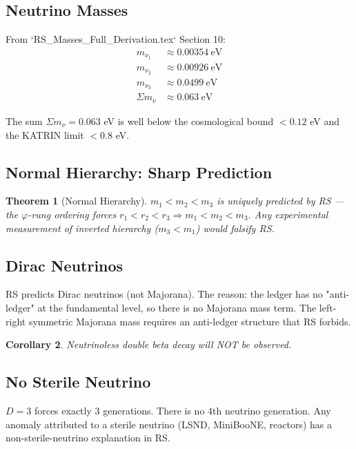 \documentclass[12pt,a4paper]{article}
\newtheorem{theorem}{Theorem}[section]
\newtheorem{corollary}[theorem]{Corollary}
\theoremstyle{definition}
\theoremstyle{remark}
\begin{document}
\subsection{Neutrino Masses}

From `RS_Masses_Full_Derivation.tex` Section 10:
\begin{align}
m_{\nu_1} &\approx 0.00354~\mathrm{eV}\\
m_{\nu_2} &\approx 0.00926~\mathrm{eV}\\
m_{\nu_3} &\approx 0.0499~\mathrm{eV}\\
\Sigma m_\nu &\approx 0.063~\mathrm{eV}
\end{align}

The sum $\Sigma m_\nu = 0.063$ eV is well below the cosmological bound $< 0.12$ eV 
and the KATRIN limit $< 0.8$ eV.

\subsection{Normal Hierarchy: Sharp Prediction}

\begin{theorem}[Normal Hierarchy]
$m_1 < m_2 < m_3$ is uniquely predicted by RS --- the $\varphi$-rung 
ordering forces $r_1 < r_2 < r_3 \Rightarrow m_1 < m_2 < m_3$.
Any experimental measurement of inverted hierarchy ($m_3 < m_1$) would falsify RS.
\end{theorem}

\subsection{Dirac Neutrinos}

RS predicts Dirac neutrinos (not Majorana). The reason: the ledger has no 
"anti-ledger" at the fundamental level, so there is no Majorana mass term. 
The left-right symmetric Majorana mass requires an anti-ledger structure that RS forbids.

\begin{corollary}
Neutrinoless double beta decay will NOT be observed.
\end{corollary}

\subsection{No Sterile Neutrino}

$D = 3$ forces exactly 3 generations. There is no 4th neutrino generation.
Any anomaly attributed to a sterile neutrino (LSND, MiniBooNE, reactors) has 
a non-sterile-neutrino explanation in RS.
\end{document}
